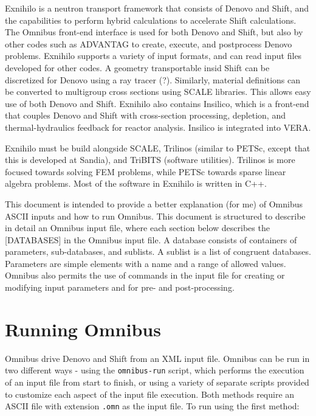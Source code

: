 \documentclass[10pt]{article}
\begin{document}
\tableofcontents
\clearpage

Exnihilo is a neutron transport framework that consists of Denovo and Shift, and the capabilities to perform hybrid calculations to accelerate Shift calculations. The Omnibus front-end interface is used for both Denovo and Shift, but also by other codes such as ADVANTAG to create, execute, and postprocess Denovo problems. Exnihilo supports a variety of input formats, and can read input files developed for other codes. A geometry transportable insid Shift can be discretized for Denovo using a ray tracer (?). Similarly, material definitions can be converted to multigroup cross sections using SCALE libraries. This allows easy use of both Denovo and Shift. Exnihilo also contains Insilico, which is a front-end that couples Denovo and Shift with cross-section processing, depletion, and thermal-hydraulics feedback for reactor analysis. Insilico is integrated into VERA.

Exnihilo must be build alongside SCALE, Trilinos (similar to PETSc, except that this is developed at Sandia), and TriBITS (software utilities). Trilinos is more focused towards solving FEM problems, while PETSc towards sparse linear algebra problems. Most of the software in Exnihilo is written in C++. 

This document is intended to provide a better explanation (for me) of Omnibus ASCII inputs and how to run Omnibus. This document is structured to describe in detail an Omnibus input file, where each section below describes the [DATABASES] in the Omnibus input file. A database consists of containers of parameters, sub-databases, and sublists. A sublist is a list of congruent databases. Parameters are simple elements with a name and a range of allowed values. Omnibus also permits the use of commands in the input file for creating or modifying input parameters and for pre- and post-processing. 

\section{Running Omnibus}
Omnibus drive Denovo and Shift from an XML input file. Omnibus can be run in two different ways - using the \texttt{omnibus-run} script, which performs the execution of an input file from start to finish, or using a variety of separate scripts provided to customize each aspect of the input file execution. Both methods require an ASCII file with extension \texttt{.omn} as the input file. To run using the first method:\newline
\end{document}
